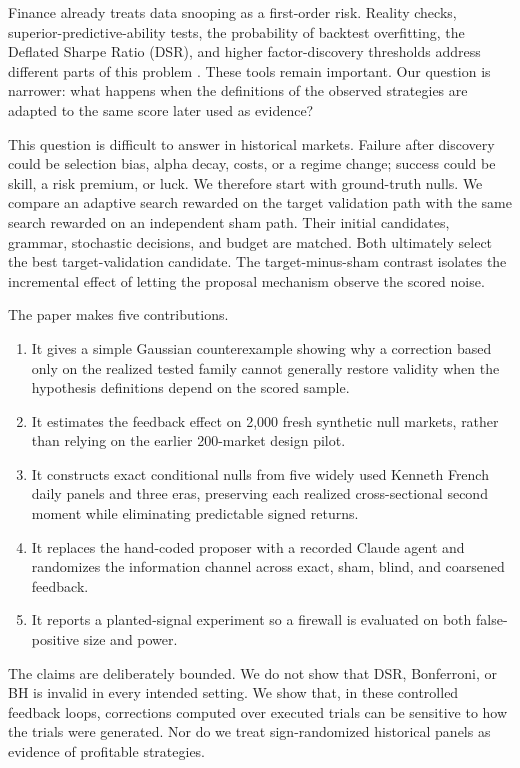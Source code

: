 \documentclass[sigconf,nonacm]{acmart}
\begin{document}
Finance already treats data snooping as a first-order risk. Reality checks,
superior-predictive-ability tests, the probability of backtest overfitting, the
Deflated Sharpe Ratio (DSR), and higher factor-discovery thresholds address
different parts of this problem \cite{white2000reality,hansen2005spa,
bailey2016pbo,bailey2014dsr,harvey2016crosssection}. These tools remain
important. Our question is narrower: what happens when the definitions of the
observed strategies are adapted to the same score later used as evidence?

This question is difficult to answer in historical markets. Failure after
discovery could be selection bias, alpha decay, costs, or a regime change;
success could be skill, a risk premium, or luck. We therefore start with
ground-truth nulls. We compare an adaptive search rewarded on the target
validation path with the same search rewarded on an independent sham path.
Their initial candidates, grammar, stochastic decisions, and budget are
matched. Both ultimately select the best target-validation candidate. The
target-minus-sham contrast isolates the incremental effect of letting the
proposal mechanism observe the scored noise.

The paper makes five contributions.

\begin{enumerate}
  \item It gives a simple Gaussian counterexample showing why a correction
  based only on the realized tested family cannot generally restore validity
  when the hypothesis definitions depend on the scored sample.
  \item It estimates the feedback effect on 2,000 fresh synthetic null markets,
  rather than relying on the earlier 200-market design pilot.
  \item It constructs exact conditional nulls from five widely used Kenneth
  French daily panels and three eras, preserving each realized cross-sectional
  second moment while eliminating predictable signed returns.
  \item It replaces the hand-coded proposer with a recorded Claude agent and
  randomizes the information channel across exact, sham, blind, and coarsened
  feedback.
  \item It reports a planted-signal experiment so a firewall is evaluated on
  both false-positive size and power.
\end{enumerate}

The claims are deliberately bounded. We do not show that DSR, Bonferroni, or BH
is invalid in every intended setting. We show that, in these controlled
feedback loops, corrections computed over executed trials can be sensitive to
how the trials were generated. Nor do we treat sign-randomized historical panels
as evidence of profitable strategies.
\end{document}
